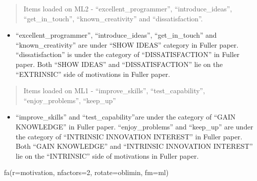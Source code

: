 \documentclass[
]{article}
\newenvironment{Shaded}{\begin{snugshade}}{\end{snugshade}}
\newcommand{\AttributeTok}[1]{\textcolor[rgb]{0.77,0.63,0.00}{#1}}
\newcommand{\DecValTok}[1]{\textcolor[rgb]{0.00,0.00,0.81}{#1}}
\newcommand{\FunctionTok}[1]{\textcolor[rgb]{0.00,0.00,0.00}{#1}}
\newcommand{\NormalTok}[1]{#1}
\newcommand{\StringTok}[1]{\textcolor[rgb]{0.31,0.60,0.02}{#1}}
\providecommand{\tightlist}{%
  \setlength{\itemsep}{0pt}\setlength{\parskip}{0pt}}
\begin{document}
\begin{quote}
Items loaded on ML2 - ``excellent\_programmer'', ``introduce\_ideas'',
``get\_in\_touch'', ``known\_creativity'' and ``dissatisfaction''.
\end{quote}

\begin{itemize}
\tightlist
\item
  ``excellent\_programmer'', ``introduce\_ideas'', ``get\_in\_touch''
  and ``known\_creativity'' are under ``SHOW IDEAS'' category in Fuller
  paper. ``dissatisfaction'' is under the category of
  ``DISSATISFACTION'' in Fuller paper. Both ``SHOW IDEAS'' and
  ``DISSATISFACTION'' lie on the ``EXTRINSIC'' side of motivations in
  Fuller paper.
\end{itemize}

\begin{quote}
Items loaded on ML1 - ``improve\_skills'', ``test\_capability'',
``enjoy\_problems'', ``keep\_up''
\end{quote}

\begin{itemize}
\tightlist
\item
  ``improve\_skills'' and ``test\_capability''are under the category of
  ``GAIN KNOWLEDGE'' in Fuller paper. ``enjoy\_problems'' and
  ``keep\_up'' are under the category of ``INTRINSIC INNOVATION
  INTEREST'' in Fuller paper. Both ``GAIN KNOWLEDGE'' and ``INTRINSIC
  INNOVATION INTEREST'' lie on the ``INTRINSIC'' side of motivations in
  Fuller paper.
\end{itemize}

\begin{Shaded}
\begin{Highlighting}[]
\FunctionTok{fa}\NormalTok{(}\AttributeTok{r=}\NormalTok{motivation, }\AttributeTok{nfactors=}\DecValTok{2}\NormalTok{, }\AttributeTok{rotate=}\StringTok{\textquotesingle{}oblimin\textquotesingle{}}\NormalTok{, }\AttributeTok{fm=}\StringTok{\textquotesingle{}ml\textquotesingle{}}\NormalTok{)}
\end{Highlighting}
\end{Shaded}
\end{document}
